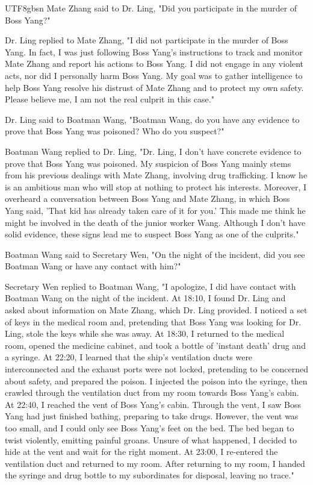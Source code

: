 \documentclass[11pt]{article}
\begin{document}
{\begin{CJK}{UTF8}{gbsn}
Mate Zhang said to Dr. Ling, "Did you participate in the murder of Boss Yang?"

Dr. Ling replied to Mate Zhang, "I did not participate in the murder of Boss Yang. In fact, I was just following Boss Yang's instructions to track and monitor Mate Zhang and report his actions to Boss Yang. I did not engage in any violent acts, nor did I personally harm Boss Yang. My goal was to gather intelligence to help Boss Yang resolve his distrust of Mate Zhang and to protect my own safety. Please believe me, I am not the real culprit in this case."

Dr. Ling said to Boatman Wang, "Boatman Wang, do you have any evidence to prove that Boss Yang was poisoned? Who do you suspect?"

Boatman Wang replied to Dr. Ling, "Dr. Ling, I don’t have concrete evidence to prove that Boss Yang was poisoned. My suspicion of Boss Yang mainly stems from his previous dealings with Mate Zhang, involving drug trafficking. I know he is an ambitious man who will stop at nothing to protect his interests. Moreover, I overheard a conversation between Boss Yang and Mate Zhang, in which Boss Yang said, 'That kid has already taken care of it for you.' This made me think he might be involved in the death of the junior worker Wang. Although I don’t have solid evidence, these signs lead me to suspect Boss Yang as one of the culprits."

Boatman Wang said to Secretary Wen, "On the night of the incident, did you see Boatman Wang or have any contact with him?"

Secretary Wen replied to Boatman Wang, "I apologize, I did have contact with Boatman Wang on the night of the incident. At 18:10, I found Dr. Ling and asked about information on Mate Zhang, which Dr. Ling provided. I noticed a set of keys in the medical room and, pretending that Boss Yang was looking for Dr. Ling, stole the keys while she was away. At 18:30, I returned to the medical room, opened the medicine cabinet, and took a bottle of 'instant death' drug and a syringe. At 22:20, I learned that the ship's ventilation ducts were interconnected and the exhaust ports were not locked, pretending to be concerned about safety, and prepared the poison. I injected the poison into the syringe, then crawled through the ventilation duct from my room towards Boss Yang's cabin. At 22:40, I reached the vent of Boss Yang's cabin. Through the vent, I saw Boss Yang had just finished bathing, preparing to take drugs. However, the vent was too small, and I could only see Boss Yang's feet on the bed. The bed began to twist violently, emitting painful groans. Unsure of what happened, I decided to hide at the vent and wait for the right moment. At 23:00, I re-entered the ventilation duct and returned to my room. After returning to my room, I handed the syringe and drug bottle to my subordinates for disposal, leaving no trace."


\end{CJK}}
\end{document}
